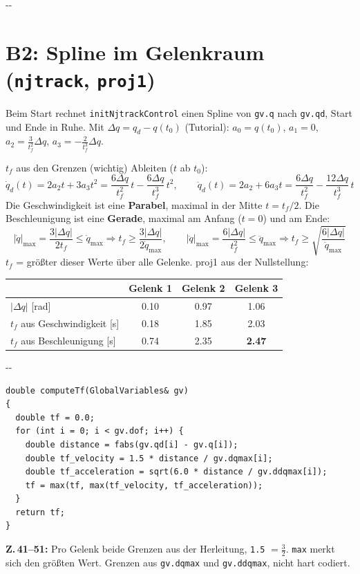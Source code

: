 \documentclass[10pt,a4paper]{article}
\makeatletter
\newcommand{\secneed}[1]{\par\penalty\@M\begingroup\setlength{\dimen@}{#1}\dimen@ii\pagegoal
  \advance\dimen@ii-\pagetotal\ifdim\dimen@>\dimen@ii\ifdim\dimen@ii>\z@\vfil\fi\penalty-\@M\fi\endgroup}
\let\oldsection\section
\renewcommand{\section}{\secneed{9\baselineskip}\oldsection}
\newcommand{\code}[1]{\texttt{#1}}
\makeatother
\begin{document}
\section{B2: Spline im Gelenkraum (\code{njtrack}, \code{proj1})}

Beim Start rechnet \code{initNjtrackControl} einen Spline von \code{gv.q} nach \code{gv.qd}, Start und Ende in Ruhe.
Mit $\Delta q = q_d - q(t_0)$ (Tutorial):
$a_0 = q(t_0)$, $a_1 = 0$, $a_2 = \frac{3}{t_f^2}\Delta q$, $a_3 = -\frac{2}{t_f^3}\Delta q$.

\begin{herleitung}{\texorpdfstring{$t_f$}{tf} aus den Grenzen (wichtig)}
Ableiten ($t$ ab $t_0$):
\[
  \dot q_d(t) = 2a_2 t + 3a_3 t^2 = \frac{6\Delta q}{t_f^2}\,t - \frac{6\Delta q}{t_f^3}\,t^2, \qquad
  \ddot q_d(t) = 2a_2 + 6a_3 t = \frac{6\Delta q}{t_f^2} - \frac{12\Delta q}{t_f^3}\,t
\]
Die Geschwindigkeit ist eine \textbf{Parabel}, maximal in der Mitte $t = t_f/2$. Die Beschleunigung ist eine
\textbf{Gerade}, maximal am Anfang ($t = 0$) und am Ende:
\[
  |\dot q|_{\max} = \frac{3|\Delta q|}{2t_f} \le \dot q_{\max} \Rightarrow t_f \ge \frac{3|\Delta q|}{2\dot q_{\max}},
  \qquad
  |\ddot q|_{\max} = \frac{6|\Delta q|}{t_f^2} \le \ddot q_{\max} \Rightarrow t_f \ge \sqrt{\frac{6|\Delta q|}{\ddot q_{\max}}}
\]
$t_f$ = größter dieser Werte über alle Gelenke. proj1 aus der Nullstellung:

\centering
{\small
\begin{tabular}{lccc}
  \toprule
  & Gelenk 1 & Gelenk 2 & Gelenk 3 \\
  \midrule
  $|\Delta q|$ [rad] & 0.10 & 0.97 & 1.06 \\
  $t_f$ aus Geschwindigkeit [s] & 0.18 & 1.85 & 2.03 \\
  $t_f$ aus Beschleunigung [s] & 0.74 & 2.35 & \textbf{2.47} \\
  \bottomrule
\end{tabular}
}
\end{herleitung}

\secneed{11\baselineskip}
\begin{lstlisting}[firstnumber=41]
double computeTf(GlobalVariables& gv)
{
  double tf = 0.0;
  for (int i = 0; i < gv.dof; i++) {
    double distance = fabs(gv.qd[i] - gv.q[i]);
    double tf_velocity = 1.5 * distance / gv.dqmax[i];
    double tf_acceleration = sqrt(6.0 * distance / gv.ddqmax[i]);
    tf = max(tf, max(tf_velocity, tf_acceleration));
  }
  return tf;
}
\end{lstlisting}
\textbf{Z.\,41--51:} Pro Gelenk beide Grenzen aus der Herleitung, \code{1.5} $= \frac{3}{2}$. \code{max} merkt sich den
größten Wert. Grenzen aus \code{gv.dqmax} und \code{gv.ddqmax}, nicht hart codiert.
\end{document}
